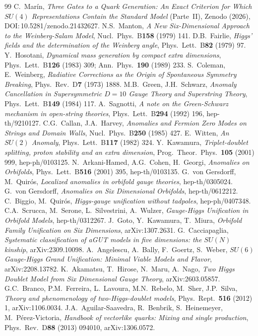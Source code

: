 \documentclass[11pt,a4paper]{article}
\begin{document}
\begin{thebibliography}{99}
 C.~Mar\'in, \emph{Three Gates to a Quark Generation: An Exact Criterion for
Which $SU(4)$ Representations Contain the Standard Model} (Parte~II), Zenodo (2026),
DOI:\,10.5281/zenodo.21432627.
 N.S.~Manton, \emph{A New Six-Dimensional Approach to the
Weinberg-Salam Model}, Nucl.\ Phys.\ B\textbf{158} (1979) 141.
 D.B.~Fairlie, \emph{Higgs' fields and the determination of the
Weinberg angle}, Phys.\ Lett.\ B\textbf{82} (1979) 97.
 Y.~Hosotani, \emph{Dynamical mass generation by compact extra
dimensions}, Phys.\ Lett.\ B\textbf{126} (1983) 309; Ann.\ Phys.\ \textbf{190} (1989) 233.
 S.~Coleman, E.~Weinberg, \emph{Radiative Corrections as the
Origin of Spontaneous Symmetry Breaking}, Phys.\ Rev.\ D\textbf{7} (1973) 1888.
 M.B.~Green, J.H.~Schwarz, \emph{Anomaly Cancellation in
Supersymmetric $D=10$ Gauge Theory and Superstring Theory}, Phys.\ Lett.\ B\textbf{149}
(1984) 117.
 A.~Sagnotti, \emph{A note on the Green-Schwarz mechanism in
open-string theories}, Phys.\ Lett.\ B\textbf{294} (1992) 196, hep-th/9210127.
 C.G.~Callan, J.A.~Harvey, \emph{Anomalies and Fermion Zero Modes
on Strings and Domain Walls}, Nucl.\ Phys.\ B\textbf{250} (1985) 427.
 E.~Witten, \emph{An $SU(2)$ Anomaly}, Phys.\ Lett.\ B\textbf{117}
(1982) 324.
 Y.~Kawamura, \emph{Triplet-doublet splitting, proton stability
and an extra dimension}, Prog.\ Theor.\ Phys.\ \textbf{105} (2001) 999, hep-ph/0103125.
 N.~Arkani-Hamed, A.G.~Cohen, H.~Georgi, \emph{Anomalies on Orbifolds},
Phys.\ Lett.\ B\textbf{516} (2001) 395, hep-th/0103135.
 G.~von Gersdorff, M.~Quir\'os, \emph{Localized anomalies in orbifold
gauge theories}, hep-th/0305024.
 G.~von Gersdorff, \emph{Anomalies on Six Dimensional Orbifolds},
hep-th/0612212.
 C.~Biggio, M.~Quir\'os, \emph{Higgs-gauge unification without
tadpoles}, hep-ph/0407348.
 C.A.~Scrucca, M.~Serone, L.~Silvestrini, A.~Wulzer,
\emph{Gauge-Higgs Unification in Orbifold Models}, hep-th/0312267.
 J.~Goto, Y.~Kawamura, T.~Miura, \emph{Orbifold Family Unification
on Six Dimensions}, arXiv:1307.2631.
 G.~Cacciapaglia, \emph{Systematic classification of aGUT models in five
dimensions: the $SU(N)$ kinship}, arXiv:2309.10098.
 A.~Angelescu, A.~Bally, F.~Goertz, S.~Weber, \emph{$SU(6)$
Gauge-Higgs Grand Unification: Minimal Viable Models and Flavor}, arXiv:2208.13782.
 K.~Akamatsu, T.~Hirose, N.~Maru, A.~Nago, \emph{Two Higgs Doublet Model
from Six Dimensional Gauge Theory}, arXiv:2603.05857.
 G.C.~Branco, P.M.~Ferreira, L.~Lavoura, M.N.~Rebelo, M.~Sher, J.P.~Silva,
\emph{Theory and phenomenology of two-Higgs-doublet models}, Phys.\ Rept.\ \textbf{516}
(2012) 1, arXiv:1106.0034.
 J.A.~Aguilar-Saavedra, R.~Benbrik, S.~Heinemeyer, M.~P\'erez-Victoria,
\emph{Handbook of vectorlike quarks: Mixing and single production}, Phys.\ Rev.\
D\textbf{88} (2013) 094010, arXiv:1306.0572.
\end{thebibliography}
\end{document}
